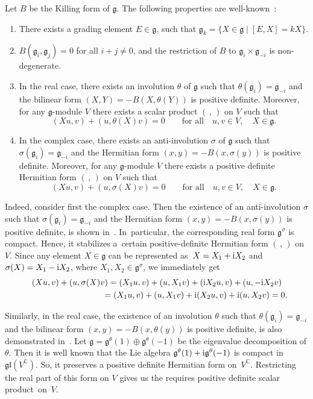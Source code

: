 \documentclass[10pt,a4paper]{amsart}
\newcommand{\C}{\mathbb C}
\newcommand{\g}{\mathfrak g}
\newcommand{\gl}{\mathfrak{gl}}
\newcommand{\V}{V}
\numberwithin{equation}{section}
\begin{document}
\smallskip
Let $B$ be the Killing form of $\g$. The following properties are well-known~\cite{capslovak}:
\begin{enumerate}\itemsep=0pt
	\item There exists a grading element $E\in \g$, such that $\g_k=\{X\in\g\mid
	[E,X]=kX\}$.
	\item $B(\g_i,\g_j)=0$ for all $i+j\ne0$, and the restriction of $B$ to
	$\g_i\times\g_{-i}$ is non-degenerate.
	\item In the real case, there exists an involution $\theta$ of $\g$
	such that $\theta(\g_i)=\g_{-i}$ and the bilinear form $(X,Y)=-B(X,\theta(Y))$
	is positive definite. Moreover, for any $\g$-module $\V$ there exists a scalar
	product $(\,,\,)$ on $\V$ such that
	\[
	(Xu,v) + (u,\theta(X)v) = 0\qquad\text{for all}\quad u,v\in V,\quad X \in\g.
	\]
	\item In the complex case, there exists an anti-involution $\sigma$ of $\g$ such that
	$\sigma(\g_i)=\g_{-i}$ and the Hermitian form $(x,y)=-B(x,\sigma(y))$ is
	positive definite. Moreover, for any $\g$-module $\V$ there exists a positive
	definite Hermitian form $(\,,\,)$ on $\V$ such that
	\[
	(Xu,v) + (u,\sigma(X)v) = 0\qquad\text{for all}\quad u,v\in V,\quad X \in\g.
	\]
\end{enumerate}

Indeed, consider first the complex case. Then the existence of an anti-involution $\sigma$ such that $\sigma(\g_i)=\g_{-i}$ and the Hermitian form $(x,y)=-B(x,\sigma(y))$ is positive definite, is shown in~\cite[Lemma~1.5]{tan79}. In~particular, the corresponding real form $\g^{\sigma}$ is compact. Hence, it stabilizes a~certain positive-definite Hermitian form $(\,,\,)$ on~$\V$. Since any element $X\in \g$ can be represented as~$X=X_1+{\rm i}X_2$ and $\sigma(X)=X_1-{\rm i}X_2$, where $X_1,X_2\in \g^\sigma$, we immediately get
\begin{gather*}
(Xu,v) + (u,\sigma(X)v) = (X_1u,v) + (u,X_1v) + ({\rm i}X_2u,v)+(u,-{\rm i}X_2v)
\\ \hphantom{(Xu,v) + (u,\sigma(X)v)}
{}= (X_1u,v) + (u,X_1v) + {\rm i}(X_2u,v)+{\rm i}(u,X_2v) = 0.
\end{gather*}

Similarly, in the real case, the existence of an involution $\theta$ such that $\theta(\g_i)=\g_{-i}$ and the bilinear form $(x,y)=-B(x,\theta(y))$ is positive definite, is also demonstrated in~\cite{tan79}. Let $\g=\g^\theta(1)\oplus\g^\theta(-1)$ be the eigenvalue decomposition of $\theta$. Then it is well known that the Lie algebra $\g^\theta(1)+{\rm i}\g^\theta(-1)$ is compact in $\gl(\V^{\C})$. So, it preserves a positive definite Hermitian form on~$\V^{\C}$. Restricting the real part of this form on $\V$ gives us the requires positive definite scalar pro\-duct~on~$\V$.
\end{document}
